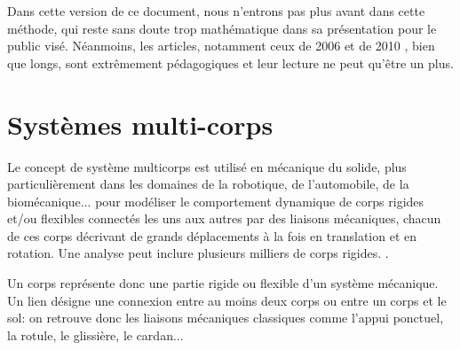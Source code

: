 \medskip
Dans cette version de ce document, nous n'entrons pas plus avant dans cette méthode, qui reste sans doute trop mathématique dans sa présentation pour le public visé. Néanmoins, les articles, notamment ceux de 2006 \cite{bib-Arnold06} et de 2010 \cite{bib-Arnold10}, bien que longs, sont extrêmement pédagogiques et leur lecture ne peut qu'être un plus.





\medskip
\section{Systèmes multi-corps}\label{Sec-MBS}

Le concept de système multicorps est utilisé en mécanique du solide, plus particulièrement dans les domaines de la robotique, de l'automobile, de la biomécanique... pour modéliser le comportement dynamique de corps rigides et/ou flexibles connectés les uns aux autres par des liaisons mécaniques, chacun de ces corps décrivant de grands déplacements à la fois en translation et en rotation. Une analyse peut inclure plusieurs milliers de corps rigides.  .

Un corps représente donc une partie rigide ou flexible d'un système mécanique. Un lien désigne une connexion entre au moins deux corps ou entre un corps et le sol: on retrouve donc les liaisons mécaniques classiques comme l'appui ponctuel, la rotule, le glissière, le cardan...

